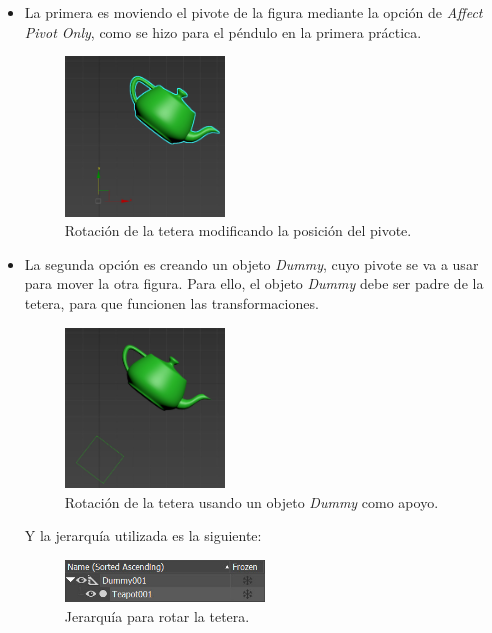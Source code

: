 \documentclass{article}
\begin{document}
\begin{itemize}
    \item La primera es moviendo el pivote de la figura mediante la opción de \textit{Affect Pivot Only}, como se hizo para el péndulo en la primera práctica.
    
    \begin{figure}[H]
        \centering
        \includegraphics[width=0.4\textwidth]{imagenes/tetepivote.jpg}
        \caption{Rotación de la tetera modificando la posición del pivote.}
     \end{figure}    
    
    \item La segunda opción es creando un objeto \textit{Dummy}, cuyo pivote se va a usar para mover la otra figura. Para ello, el objeto \textit{Dummy} debe ser padre de la tetera, para que funcionen las transformaciones.
    \begin{figure}[H]
        \centering
        \includegraphics[width=0.4\textwidth]{imagenes/tetedummy.jpg}
        \caption{Rotación de la tetera usando un objeto \textit{Dummy} como apoyo.}
     \end{figure}    

     Y la jerarquía utilizada es la siguiente:

     \begin{figure}[H]
        \centering
        \includegraphics[width=0.5\textwidth]{imagenes/tetejer.jpg}
        \caption{Jerarquía para rotar la tetera.}
     \end{figure}         
\end{itemize}
\end{document}
